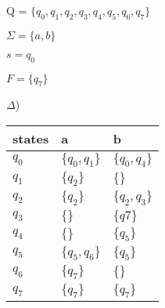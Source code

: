 \documentclass[12pt]{article}
\begin{document}
Q = $\{q_0, q_1, q_2, q_3, q_4, q_5, q_6, q_7\}$

$\Sigma = \{a, b\}$

$s = q_0$

$F = \{q_7\}$

$\Delta$)
\begin{tabular}{ l l l } 
  \hline
  states & a & b \\ 
  \hline
  $q_0$ & $\{q_0, q_1\}$ & $\{q_0, q_4\}$ \\ 
  $q_1$ & $\{q_2\}$ & $\{\}$ \\
  $q_2$ & $\{q_2\}$ & $\{q_2, q_3\}$ \\
  $q_3$ & $\{\}$ & $\{q7\}$ \\
  $q_4$ & $\{\}$ & $\{q_5\}$ \\
  $q_5$ & $\{q_5, q_6\}$ & $\{q_5\}$ \\
  $q_6$ & $\{q_7\}$ & $\{\}$ \\
  $q_7$ & $\{q_7\}$ & $\{q_7\}$ \\
  \hline
\end{tabular}
\end{document}
